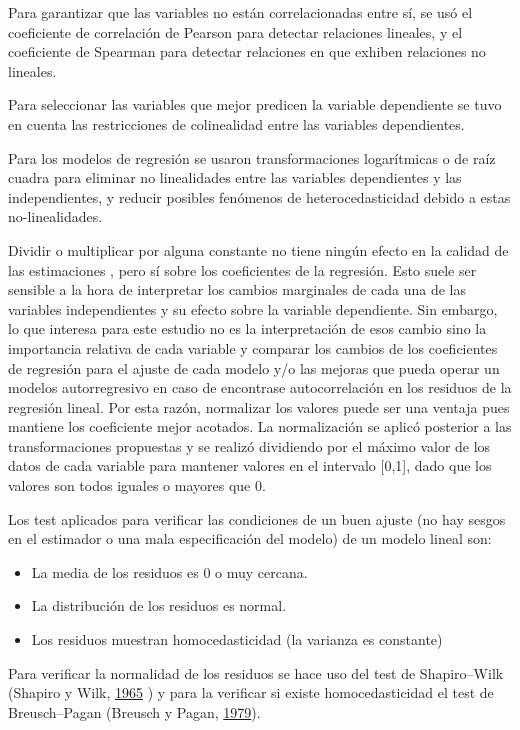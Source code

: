 \documentclass[12pt,a4paper,oneside, openany]{book}
\providecommand{\tightlist}{%
  \setlength{\itemsep}{0pt}\setlength{\parskip}{0pt}}
\theoremstyle{definition}
\theoremstyle{definition}
\theoremstyle{definition}
\theoremstyle{remark}
\begin{document}
Para garantizar que las variables no están correlacionadas entre sí, se
usó el coeficiente de correlación de Pearson para detectar relaciones
lineales, y el coeficiente de Spearman para detectar relaciones en que
exhiben relaciones no lineales.

Para seleccionar las variables que mejor predicen la variable
dependiente se tuvo en cuenta las restricciones de colinealidad entre
las variables dependientes.

Para los modelos de regresión se usaron transformaciones logarítmicas o
de raíz cuadra para eliminar no linealidades entre las variables
dependientes y las independientes, y reducir posibles fenómenos de
heterocedasticidad debido a estas no-linealidades.

Dividir o multiplicar por alguna constante no tiene ningún efecto en la
calidad de las estimaciones , pero sí sobre los coeficientes de la
regresión. Esto suele ser sensible a la hora de interpretar los cambios
marginales de cada una de las variables independientes y su efecto sobre
la variable dependiente. Sin embargo, lo que interesa para este estudio
no es la interpretación de esos cambio sino la importancia relativa de
cada variable y comparar los cambios de los coeficientes de regresión
para el ajuste de cada modelo y/o las mejoras que pueda operar un
modelos autorregresivo en caso de encontrase autocorrelación en los
residuos de la regresión lineal. Por esta razón, normalizar los valores
puede ser una ventaja pues mantiene los coeficiente mejor acotados. La
normalización se aplicó posterior a las transformaciones propuestas y se
realizó dividiendo por el máximo valor de los datos de cada variable
para mantener valores en el intervalo {[}0,1{]}, dado que los valores
son todos iguales o mayores que 0.

Los test aplicados para verificar las condiciones de un buen ajuste (no
hay sesgos en el estimador o una mala especificación del modelo) de un
modelo lineal son:

\begin{itemize}
\tightlist
\item
  La media de los residuos es 0 o muy cercana.
\item
  La distribución de los residuos es normal.
\item
  Los residuos muestran homocedasticidad (la varianza es constante)
\end{itemize}

Para verificar la normalidad de los residuos se hace uso del test de
Shapiro--Wilk (Shapiro y Wilk,
\protect\hyperlink{ref-shapiro1965analysis}{1965} ) y para la verificar
si existe homocedasticidad el test de Breusch--Pagan (Breusch y Pagan,
\protect\hyperlink{ref-breusch1979simple}{1979}).
\end{document}
